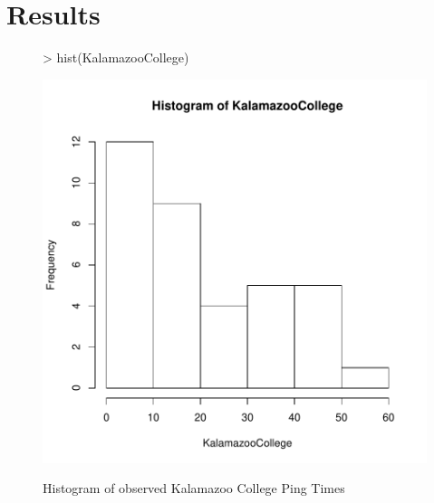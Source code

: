 \documentclass{article}
\begin{document}
\section{Results}
\begin{figure}
\centering
\caption{Histogram of observed Kalamazoo College Ping Times}
\begin{Schunk}
\begin{Sinput}
> hist(KalamazooCollege)
\end{Sinput}
\end{Schunk}
\includegraphics{FinalProjectPingTimes-002}
\label{fig:kzootimes}
\end{figure}
\end{document}

